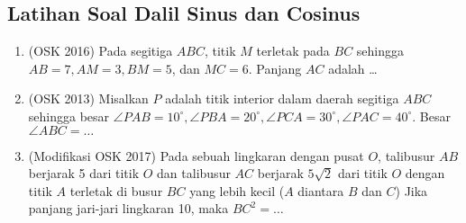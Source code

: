 \subsection{Latihan Soal Dalil Sinus dan Cosinus}
\begin{enumerate}
    \item (OSK 2016) Pada segitiga $ABC$, titik $M$ terletak pada $BC$ sehingga $AB=7, AM=3, BM=5$, dan $MC=6$. Panjang $AC$ adalah \dots

    \item (OSK 2013) Misalkan $P$ adalah titik interior dalam daerah segitiga $ABC$ sehingga besar $\angle PAB = 10^\circ, \angle PBA = 20^\circ, \angle PCA = 30^\circ, \angle PAC=40^\circ$. Besar $\angle ABC = \dots$
    
    \item (Modifikasi OSK 2017) Pada sebuah lingkaran dengan pusat $O$, talibusur $AB$ berjarak 5 dari titik $O$ dan talibusur $AC$ berjarak $5\sqrt{2}$ dari titik $O$ dengan titik $A$ terletak di busur $BC$ yang lebih kecil ($A$ diantara $B$ dan $C$) Jika panjang jari-jari lingkaran 10, maka $BC^2=\dots$
\end{enumerate}